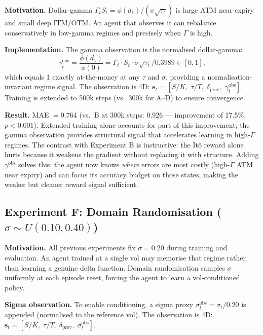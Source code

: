 \documentclass[12pt,a4paper]{article}
\begin{document}
\textbf{Motivation.}  Dollar-gamma $\Gamma_t S_t = \phi(d_1)/(\sigma\sqrt{\tau_t})$
is large ATM near-expiry and small deep ITM/OTM.  An agent that observes it
can rebalance conservatively in low-gamma regimes and precisely when
$\Gamma$ is high.

\textbf{Implementation.}  The gamma observation is the normalised
dollar-gamma:
\begin{equation}
  \gamma_t^{\mathrm{obs}} = \frac{\phi(d_1)}{\phi(0)}
  = \Gamma_t \cdot S_t \cdot \sigma\sqrt{\tau_t} / 0.3989 \in [0,1],
  \label{eq:gamma_obs}
\end{equation}
which equals 1 exactly at-the-money at any $\tau$ and $\sigma$, providing a
normalisation-invariant regime signal.  The observation is 4D:
$\mathbf{s}_t = [S/K,\;\tau/T,\;\delta_{\mathrm{prev}},\;\gamma_t^{\mathrm{obs}}]$.
Training is extended to 500k steps (vs.\ 300k for A--D) to ensure convergence.

\textbf{Result.}  MAE $= 0.764$ (vs.\ B at 300k steps: 0.926 --- improvement
of 17.5\%, $p<0.001$).  Extended training alone accounts for part of this
improvement; the gamma observation provides structural signal that accelerates
learning in high-$\Gamma$ regimes.
The contrast with Experiment B is instructive: the It\^{o} reward alone hurts
because it weakens the gradient without replacing it with structure.  Adding
$\gamma^{\mathrm{obs}}$ solves this: the agent now knows \emph{where} errors
are most costly (high-$\Gamma$ ATM near expiry) and can focus its accuracy
budget on those states, making the weaker but cleaner reward signal sufficient.

\subsection{Experiment F: Domain Randomisation ($\sigma\sim U(0.10,0.40)$)}

\textbf{Motivation.}  All previous experiments fix $\sigma=0.20$ during
training and evaluation.  An agent trained at a single vol may memorise
that regime rather than learning a genuine delta function.  Domain
randomisation samples $\sigma$ uniformly at each episode reset, forcing the
agent to learn a vol-conditioned policy.

\textbf{Sigma observation.}  To enable conditioning, a sigma proxy
$\sigma_t^{\mathrm{obs}} = \sigma_t / 0.20$ is appended (normalised to
the reference vol).  The observation is 4D:
$\mathbf{s}_t = [S/K,\;\tau/T,\;\delta_{\mathrm{prev}},\;\sigma_t^{\mathrm{obs}}]$.
\end{document}
